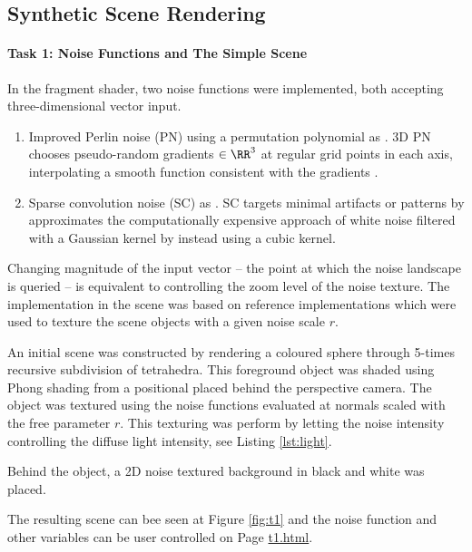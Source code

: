 \documentclass[12pt,fleqn]{article}
\begin{document}
\subsection{Synthetic Scene Rendering}
\paragraph{Task 1: Noise Functions and The Simple Scene}
In the fragment shader, two noise functions were implemented, both accepting three-dimensional vector input.
\begin{enumerate}
    \item Improved Perlin noise (PN) using a permutation polynomial as \citeauthor{mcewan2012efficient} \cite{mcewan2012efficient}. 3D PN chooses pseudo-random gradients $\in \RR^3$ at regular grid points in each axis, interpolating a smooth function consistent with the gradients \cite{gustavson2005simplex}. 
    \item Sparse convolution noise (SC) as \citeauthor{frisvad2007fast} \cite{frisvad2007fast}. SC targets minimal artifacts or patterns by approximates the computationally expensive approach of white noise filtered with a Gaussian kernel by instead using a cubic kernel.
\end{enumerate}
Changing magnitude of the input vector -- the point at which the noise landscape is queried -- is equivalent to controlling the zoom level of the noise texture.
The implementation in the scene was based on reference implementations \cite{frisvad2016exploring} which were used to texture the scene objects with a given noise scale $r$.

An initial scene was constructed by rendering a coloured sphere through 5-times recursive subdivision of tetrahedra.
This foreground object was shaded using Phong shading from a positional placed behind the perspective camera.
The object was textured using the noise functions evaluated at normals scaled with the free parameter $r$.
This texturing was perform by letting the noise intensity controlling the diffuse light intensity, see Listing \ref{lst:light}.

Behind the object, a 2D noise textured background in black and white was placed.

The resulting scene can bee seen at Figure \ref{fig:t1} and the noise function and other variables can be user controlled on Page \href{https://www.student.dtu.dk/~s183911/proj/webgl-site/t1.html}{t1.html}.

\end{document}

